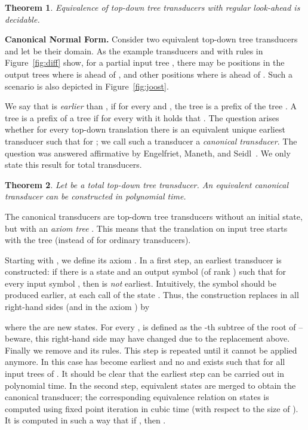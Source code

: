 \documentclass[copyright,creativecommons]{eptcs}
\newtheorem{theorem}{Theorem}
\newcommand{\eop}{\hspace*{\fill}}
\newenvironment{proof}{{\it Proof.}\quad}{\eop\vspace*{4mm}}
\begin{document}
\begin{theorem}\rm\label{theo:dtr}
Equivalence of top-down tree transducers with
regular look-ahead is decidable.
\end{theorem}


\medskip

{\bf Canonical Normal Form.}\quad
Consider two equivalent top-down tree transducers 
and let  be their domain. 
As the example transducers  and  with rules
in Figure~\ref{fig:diff} show, 
for a partial input tree , 
there may be positions in the output trees
where  is ahead of , and other positions
where  is ahead of . 
Such a scenario is also depicted in Figure~\ref{fig:joost}.

We say that  is \emph{earlier} than ,
if for every  and , 
the tree  is a prefix of the tree .
A tree  is a prefix of a tree  if for every 
with  it holds that . 
The question arises whether for every top-down translation there is an
equivalent unique earliest transducer  such that
 for ; we call such a transducer
a \emph{canonical transducer}.
The question was answered affirmative by
Engelfriet, Maneth, and Seidl~\cite{DBLP:journals/jcss/EngelfrietMS09}.
We only state this result for total transducers.

\begin{theorem}\rm\label{theo:EMS}
Let  be a total top-down tree transducer. An equivalent canonical 
transducer can be constructed in polynomial time. 
\end{theorem}
\begin{proof}
The canonical transducers are top-down tree transducers 
without an initial state, but with 
an \emph{axiom tree} . 
This means that the translation on input tree 
starts with the tree  
(instead of  for ordinary transducers).

Starting with , we define its axiom .
In a first step, an earliest transducer is constructed:
if there is a state  and an output symbol  (of rank )
such that  for every input symbol ,
then  is \emph{not} earliest. 
Intuitively, the symbol  should be produced earlier, at
each call of the state . Thus, the construction 
replaces  in all right-hand sides (and in the axiom ) by 

where the  are new states.
For every ,  
is defined as the -th subtree of the root of 
 -- beware, this right-hand side may have
changed due to the replacement above. 
Finally we remove  and its rules.
This step is repeated until it cannot be applied anymore. 
In this case  has become earliest and 
no  and  exists such that
 for all input trees  of . 
It should be clear that the earliest step can be carried
out in polynomial time.
In the second step, equivalent states are merged to obtain the canonical transducer;
the corresponding 
equivalence relation on states is computed using
fixed point iteration in cubic time (with respect to the size of ).
It is computed in such a way that if , then .
\end{proof}
\end{document}
